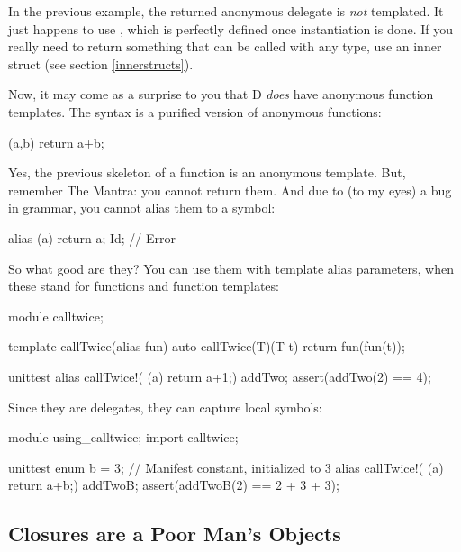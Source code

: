 In the previous example, the returned anonymous delegate is \emph{not} templated. It just happens to use , which is perfectly defined once instantiation is done. If you really need to return something that can be called with any type, use an inner struct (see section \ref{innerstructs}).

Now, it may come as a surprise to you that D \emph{does} have anonymous function templates. The syntax is a purified version of anonymous functions:

\begin{dcode}
(a,b) { return a+b;} 
\end{dcode} 

Yes, the previous skeleton of a function is an anonymous template. But, remember The Mantra: you cannot return them. And due to (to my eyes) a bug in  grammar, you cannot alias them to a symbol:

\begin{dcode}
alias (a){ return a;} Id; // Error
\end{dcode}

So what good are they? You can use them with template alias parameters, when these stand for functions and function templates:

\begin{dcode}
module calltwice;

template callTwice(alias fun)
{
    auto callTwice(T)(T t)
    {
        return fun(fun(t));
    }
}

unittest
{
    alias callTwice!( (a){ return a+1;}) addTwo;
    assert(addTwo(2) == 4);
}
\end{dcode}

Since they are delegates, they can capture local symbols:

\begin{dcode}
module using_calltwice;
import calltwice;

unittest
{
    enum b = 3; // Manifest constant, initialized to 3
    alias callTwice!( (a){ return a+b;}) addTwoB;
    assert(addTwoB(2) == 2 + 3 + 3);
}
\end{dcode}

\subsection{Closures are a Poor Man's Objects}\label{closuresareapoormansobjects}

